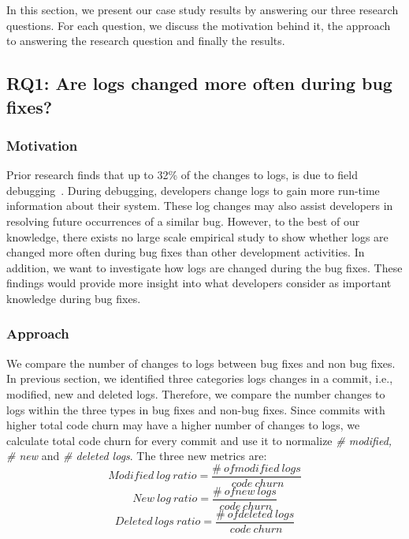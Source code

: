 	In this section, we present our case study results by answering our three research questions. For each question, we discuss the motivation behind it, the approach to answering the research question and finally the results.

\subsection*{\textbf{RQ1: Are logs changed more often during bug fixes?}}


\subsubsection*{\textbf{Motivation}}

Prior research finds that up to 32\% of the changes to logs, is due to field debugging~\cite{EMSEIAN}. During debugging, developers change logs to gain more run-time information about their system. These log changes may also assist developers in resolving future occurrences of a similar bug. However, to the best of our knowledge, there exists no large scale empirical study to show whether logs are changed more often during bug fixes than other development activities. In addition, we want to investigate how logs are changed during the bug fixes. These findings would provide more insight into what developers consider as important knowledge during bug fixes.

\subsubsection*{\textbf{Approach}}

We compare the number of changes to logs between bug fixes and non bug fixes. In previous section, we identified three categories logs changes in a commit, i.e., modified, new and deleted logs. Therefore, we compare the number changes to logs within the three types in bug fixes and non-bug fixes. Since commits with higher total code churn may have a higher number of changes to logs, we calculate total code churn for every commit and use it to normalize \emph{\# modified, \# new} and \emph{\# deleted logs}. The three new metrics are:
\begin{equation}
Modified\ log\ ratio = \frac{\#\ of modified\ logs}{\ code\ churn } 
\label{eq1}
\end{equation}
\begin{equation}
New\ log\  ratio = \frac{\#\ of new\ logs}{\ code\ churn } 
\label{eq2}
\end{equation}
\begin{equation}
Deleted\ logs\ ratio = \frac{\#\ of deleted\ logs}{\ code\ churn }
\label{eq3} 
\end{equation}

